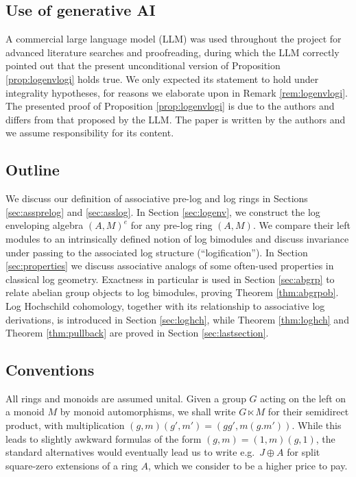 \documentclass[a4paper,10pt%
]{amsart}
\numberwithin{equation}{section}
\theoremstyle{definition}
\renewcommand{\:}{\colon}
\begin{document}
\subsection{Use of generative AI} A commercial large language model (LLM) was used throughout the project for advanced literature searches and proofreading, during which the LLM correctly pointed out that the present unconditional version of Proposition \ref{prop:logenvlogi} holds true. We only expected its statement to hold under integrality hypotheses, for reasons we elaborate upon in Remark \ref{rem:logenvlogi}. The presented proof of Proposition \ref{prop:logenvlogi} is due to the authors and differs from that proposed by the LLM. The paper is written by the authors and we assume responsibility for its content. 

\subsection{Outline} We discuss our definition of associative pre-log and log rings in Sections \ref{sec:assprelog} and \ref{sec:asslog}. In Section \ref{sec:logenv}, we construct the log enveloping algebra $(A, M)^e$ for any pre-log ring $(A, M)$. We compare their left modules to an intrinsically defined notion of log bimodules and discuss invariance under passing to the associated log structure (``logification''). In Section \ref{sec:properties} we discuss associative analogs of some often-used properties in classical log geometry. Exactness in particular is used in Section \ref{sec:abgrp} to relate abelian group objects to log bimodules, proving Theorem \ref{thm:abgrpob}. Log Hochschild cohomology, together with its relationship to associative log derivations, is introduced in Section \ref{sec:loghch}, while Theorem \ref{thm:loghch} and Theorem \ref{thm:pullback} are proved in Section \ref{sec:lastsection}. 

\subsection{Conventions} All rings and monoids are assumed unital. Given a group $G$ acting on the left on a monoid $M$ by monoid automorphisms, we shall write $G \ltimes M$ for their semidirect product, with multiplication $(g, m)(g', m') = (gg', m(g.m'))$. While this leads to slightly awkward formulas of the form $(g, m) = (1, m)(g, 1)$, the standard alternatives would eventually lead us to write e.g.\ $J \oplus A$ for split square-zero extensions of a ring $A$, which we consider to be a higher price to pay. 
\end{document}
